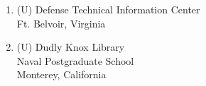 \documentclass[twoside,thesis,classified]{npsreport}
\begin{document}
%

%

%
%
\NPSend        

%
\begin{enumerate}
\item (U) Defense Technical Information Center\\Ft. Belvoir, Virginia
\item (U) Dudly Knox Library\\Naval Postgraduate School\\Monterey, California
\end{enumerate}
\end{document}
